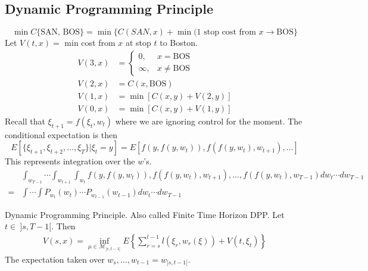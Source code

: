 \subsection{Dynamic Programming Principle}
$$\min C\{\text{SAN, BOS}\} = \min\{C(SAN,x) + \min(\text{1 stop cost from }x\to\text{BOS}\}$$
Let $V(t,x) =$ min cost from $x$ at stop $t$ to Boston.
\begin{align*}
V(3,x) &= \begin{cases} 0, & x=\text{BOS} \\ \infty, & x\neq\text{BOS} \end{cases} \\
V(2,x) &= C(x,\text{BOS}) \\
V(1,x) &= \min[C(x,y)+V(2,y)] \\
V(0,x) &= \min[C(x,y)+V(1,y)]
\end{align*}
Recall that $\xi_{t+1}=f(\xi_t,w_t)$ where we are ignoring control for the moment. The conditional expectation is then
$$E[\{\xi_{t+1},\xi_{t+2},\ldots,\xi_T\}|\xi_t=y] = E[f(y,f(y,w_t)),f(f(y,w_t),w_{t+1}),\ldots]$$
This represents integration over the $w$'s.
\begin{align*}
&\int_{w_{T-1}}\cdots\int_{w_{t+1}}\int_{w_t}f(y,f(y,w_t)),f(f(y,w_t),w_{t+1}),\ldots,f(f(y,w_t),w_{T-1})dw_t\cdots dw_{T-1} \\
= &\int\cdots\int P_{w_t}(w_t)\cdots P_{w_{t-1}}(w_{t-1})dw_t\cdots dw_{T-1}
\end{align*}

\begin{theorem}{Dynamic Programming Principle.}
Also called Finite Time Horizon DPP. Let $t\in~]s,T-1[$. Then
\begin{align}
\label{eq:dpp}
V(s,x) = \inf_{\mu\in\mathcal{M}_{]s,t-1[}}E\left\lbrace\sum_{r=s}^{t-1}l(\xi_r,w_r(\xi)) + V(t,\xi_t)\right\rbrace
\end{align}
The expectation taken over $w_s,\ldots,w_{t-1} = w_{]s,t-1[}$.
\end{theorem}

